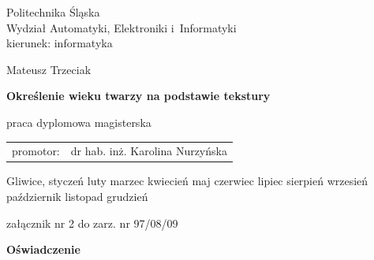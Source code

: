 \documentclass[a4paper,twoside,12pt]{book}
\newcommand{\miesiac}{%
\ifcase\the\month
\or styczeń%
\or luty%
\or marzec%
\or kwiecień%
\or maj%
\or czerwiec%
\or lipiec%
\or sierpień%
\or wrzesień%
\or październik%
\or listopad%
\or grudzień%
\fi}
\newcommand{\autor}{Mateusz Trzeciak}
\newcommand{\promotor}{dr hab.
inż.
Karolina Nurzyńska}
\newcommand{\tytul}{Określenie wieku twarzy na podstawie tekstury}
\begin{document}

    \pagestyle{empty}
    \sffamily

    \noindent

    \begin{center}
        \large
        Politechnika Śląska\\
        Wydział Automatyki, Elektroniki i~Informatyki \\
        kierunek: informatyka
    \end{center}

    \vfill\vfill
    \begin{center}
        \large
        \autor
    \end{center}

    \vfill
    \begin{center}
        \LARGE\bfseries \tytul
    \end{center}

    \vfill
    \begin{center}
        \large
        praca dyplomowa magisterska
    \end{center}

    \vfill\vfill\vfill
    \begin{center}
        \large
        \begin{tabular}{ll}
            promotor: & \promotor \\
        \end{tabular}

    \end{center}

    \vfill
    \begin{center}
        \large
        Gliwice,  \miesiac\ \the\year
    \end{center}

    \cleardoublepage


    \rmfamily
    \normalfont

    \cleardoublepage

    \begin{flushright}
        załącznik nr 2 do zarz.
        nr 97/08/09
    \end{flushright}

    \vfill

    \begin{center}
        \Large\bfseries Oświadczenie
    \end{center}
\end{document}
